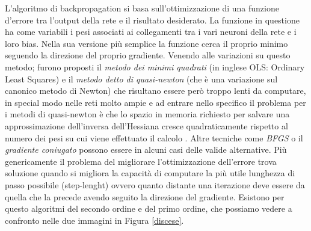 L'algoritmo di backpropagation si basa sull'ottimizzazione di una funzione d'errore tra l'output della rete e il risultato desiderato. La funzione in questione ha come variabili i pesi associati ai collegamenti tra i vari neuroni della rete e i loro bias. Nella sua versione più semplice la funzione cerca il proprio minimo seguendo la direzione del proprio gradiente.
Venendo alle variazioni su questo metodo; furono proposti il \textit{metodo dei minimi quadrati} (in inglese OLS: Ordinary Least Squares) e il \textit{metodo detto di quasi-newton} (che è una variazione sul canonico metodo di Newton) che risultano essere però troppo lenti da computare, in special modo nelle reti molto ampie e ad entrare nello specifico il problema per i metodi di quasi-newton è che lo spazio in memoria richiesto per salvare una approssimazione dell'inversa dell'Hessiana cresce quadraticamente rispetto al numero dei pesi su cui viene effettuato il calcolo \cite{saito1997partial}. Altre tecniche come \textit{BFGS} o il \textit{gradiente coniugato} possono essere in alcuni casi delle valide alternative.
Più genericamente il problema del migliorare l'ottimizzazione dell'errore trova soluzione quando si migliora la capacità di computare la più utile lunghezza di passo possibile (step-lenght) ovvero quanto distante una iterazione deve essere da quella che la precede avendo seguito la direzione del gradiente.
Esistono per questo algoritmi del secondo ordine e del primo ordine, che possiamo vedere a confronto nelle due immagini in Figura \ref{discese}.

\vspace{5 mm}

